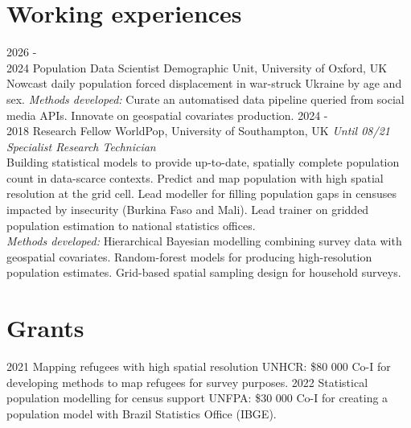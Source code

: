 \documentclass[
]{friggeri-cv}
\begin{document}
\section{Working experiences}
\begin{entrylist}
\entry
{2026 - \\ 2024}
{Population Data Scientist}
{Demographic Unit, University of Oxford, UK}
{Nowcast daily population forced displacement in war-struck Ukraine by age and sex.
\textit{Methods developed:} Curate an automatised data pipeline queried from social media APIs. Innovate on geospatial covariates production.}
\entry
{2024 - \\ 2018}
{Research Fellow}
{WorldPop, University of Southampton, UK}
{\textit{Until 08/21 Specialist Research Technician}\\
Building statistical models to provide up-to-date, spatially complete population count in data-scarce contexts. Predict and map population with high spatial resolution at the grid cell.   Lead modeller for filling population gaps in censuses impacted by insecurity (Burkina Faso and Mali). Lead trainer on gridded population estimation to national statistics offices. \\
\textit{Methods developed:} Hierarchical Bayesian modelling combining survey data with geospatial covariates. Random-forest models for producing high-resolution population estimates. Grid-based spatial sampling design for household surveys.
}
\end{entrylist}

\section{Grants}
\begin{entrylist}
\entry
{2021}
{Mapping refugees with high spatial resolution}
{UNHCR: \$80 000}
{Co-I for developing methods to map refugees for survey purposes.}
\entry
{2022}
{Statistical population modelling for census support}
{UNFPA: \$30 000}
{Co-I for creating a population model with Brazil Statistics Office (IBGE).}
\end{entrylist}
\end{document}
